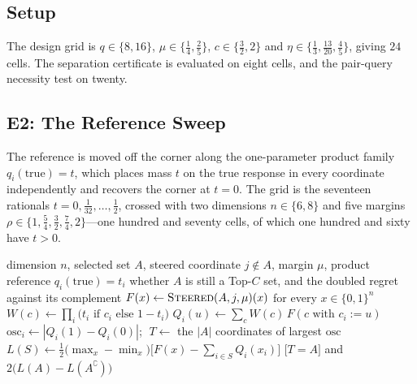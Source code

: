 \subsection{Setup}

The design grid is $q\in\{8,16\}$, $\mu\in\{\tfrac14,\tfrac25\}$, $c\in\{\tfrac32,2\}$ and
$\eta\in\{\tfrac13,\tfrac{13}{20},\tfrac45\}$, giving $24$ cells. The separation certificate
is evaluated on eight cells, and the pair-query necessity test on twenty.

\subsection{E2: The Reference Sweep}
\label{sec:e2}

The reference is moved off the corner along the one-parameter product family
$q_{i}(\mathrm{true})=t$, which places mass $t$ on the true response in every coordinate
independently and recovers the corner at $t=0$. The grid is the seventeen rationals
$t=0,\tfrac1{32},\dots,\tfrac12$, crossed with two dimensions $n\in\{6,8\}$ and five margins
$\rho\in\{1,\tfrac54,\tfrac32,\tfrac74,2\}$---one hundred and seventy cells, of which one
hundred and sixty have $t>0$.

\begin{algorithm}[htbp]
\caption{Evaluating the construction under one reference}
\label{alg:sweep}
\begin{algorithmic}[1]
\REQUIRE dimension $n$, selected set $A$, steered coordinate $j\notin A$, margin $\mu$,
         product reference $q_{i}(\mathrm{true})=t_{i}$
\ENSURE whether $A$ is still a Top-$C$ set, and the doubled regret against its complement
\STATE $F(x)\leftarrow\textsc{Steered}(A,j,\mu)(x)$ for every $x\in\{0,1\}^{n}$
\STATE $W(c)\leftarrow\prod_{i}\bigl(t_{i}\text{ if }c_{i}\text{ else }1-t_{i}\bigr)$
  \STATE $Q_{i}(u)\leftarrow\sum_{c}W(c)\,F(c\text{ with }c_{i}:=u)$
\ENDFOR
\STATE $\mathrm{osc}_{i}\leftarrow|Q_{i}(1)-Q_{i}(0)|$;
       $\;T\leftarrow$ the $|A|$ coordinates of largest $\mathrm{osc}$
\STATE $L(S)\leftarrow\tfrac12\bigl(\max_{x}-\min_{x}\bigr)
       \bigl[F(x)-\sum_{i\in S}Q_{i}(x_{i})\bigr]$
\RETURN $\bigl[T=A\bigr]$ and $2\bigl(L(A)-L(A^{\complement})\bigr)$
\end{algorithmic}
\end{algorithm}

